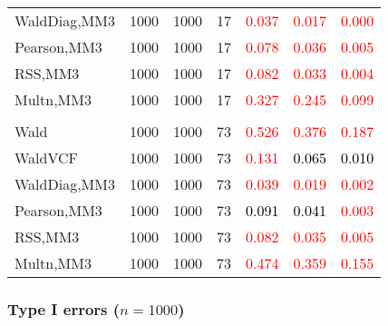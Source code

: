 \documentclass[
]{article}
\begin{document}
\begin{table}[H]
{\begin{tabular}[t]{lrrrrrr}
\hspace{1em}WaldDiag,MM3 & 1000 & 1000 & 17 & \textcolor{red}{0.037} & \textcolor{red}{0.017} & \textcolor{red}{0.000}\\
\hspace{1em}Pearson,MM3 & 1000 & 1000 & 17 & \textcolor{red}{0.078} & \textcolor{red}{0.036} & \textcolor{red}{0.005}\\
\hspace{1em}RSS,MM3 & 1000 & 1000 & 17 & \textcolor{red}{0.082} & \textcolor{red}{0.033} & \textcolor{red}{0.004}\\
\hspace{1em}Multn,MM3 & 1000 & 1000 & 17 & \textcolor{red}{0.327} & \textcolor{red}{0.245} & \textcolor{red}{0.099}\\
\addlinespace[0.3em]
\multicolumn{7}{l}{\textbf{3F 15V}}\\
\hspace{1em}Wald & 1000 & 1000 & 73 & \textcolor{red}{0.526} & \textcolor{red}{0.376} & \textcolor{red}{0.187}\\
\hspace{1em}WaldVCF & 1000 & 1000 & 73 & \textcolor{red}{0.131} & \textcolor{black}{0.065} & \textcolor{black}{0.010}\\
\hspace{1em}WaldDiag,MM3 & 1000 & 1000 & 73 & \textcolor{red}{0.039} & \textcolor{red}{0.019} & \textcolor{red}{0.002}\\
\hspace{1em}Pearson,MM3 & 1000 & 1000 & 73 & \textcolor{black}{0.091} & \textcolor{black}{0.041} & \textcolor{red}{0.003}\\
\hspace{1em}RSS,MM3 & 1000 & 1000 & 73 & \textcolor{red}{0.082} & \textcolor{red}{0.035} & \textcolor{red}{0.005}\\
\hspace{1em}Multn,MM3 & 1000 & 1000 & 73 & \textcolor{red}{0.474} & \textcolor{red}{0.359} & \textcolor{red}{0.155}\\
\bottomrule
\end{tabular}}
\endgroup{}
\end{table}

\hypertarget{type-i-errors-n1000-2}{%
\subsubsection{\texorpdfstring{Type I errors
(\(n=1000\))}{Type I errors (n=1000)}}\label{type-i-errors-n1000-2}}
\end{document}
